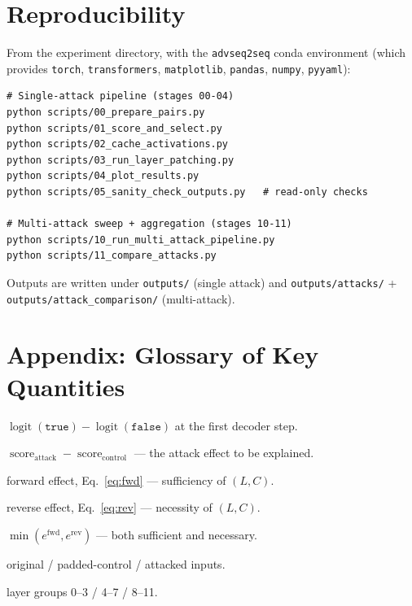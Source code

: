 \documentclass[11pt]{article}
\newcommand{\fwd}{\ensuremath{e^{\mathrm{fwd}}}}
\newcommand{\rev}{\ensuremath{e^{\mathrm{rev}}}}
\newcommand{\score}{\operatorname{score}}
\begin{document}
\section{Reproducibility}

From the experiment directory, with the \texttt{advseq2seq} conda environment
(which provides \texttt{torch}, \texttt{transformers}, \texttt{matplotlib},
\texttt{pandas}, \texttt{numpy}, \texttt{pyyaml}):

\begin{lstlisting}
# Single-attack pipeline (stages 00-04)
python scripts/00_prepare_pairs.py
python scripts/01_score_and_select.py
python scripts/02_cache_activations.py
python scripts/03_run_layer_patching.py
python scripts/04_plot_results.py
python scripts/05_sanity_check_outputs.py   # read-only checks

# Multi-attack sweep + aggregation (stages 10-11)
python scripts/10_run_multi_attack_pipeline.py
python scripts/11_compare_attacks.py
\end{lstlisting}

\noindent Outputs are written under \texttt{outputs/} (single attack) and
\texttt{outputs/attacks/} + \texttt{outputs/attack\_comparison/} (multi-attack).

\section*{Appendix: Glossary of Key Quantities}

\begin{description}[leftmargin=1.4em,style=nextline]
  \item[$\score$] $\operatorname{logit}(\texttt{true})-\operatorname{logit}(\texttt{false})$ at the first decoder step.
  \item[$\Delta$] $\score_{\text{attack}}-\score_{\text{control}}$ — the attack effect to be explained.
  \item[$\fwd_{L,C}$] forward effect, Eq.~\eqref{eq:fwd} — sufficiency of $(L,C)$.
  \item[$\rev_{L,C}$] reverse effect, Eq.~\eqref{eq:rev} — necessity of $(L,C)$.
  \item[combined] $\min(\fwd,\rev)$ — both sufficient and necessary.
  \item[Type A / B / C] original / padded-control / attacked inputs.
  \item[early / mid / late] layer groups 0--3 / 4--7 / 8--11.
\end{description}
\end{document}
